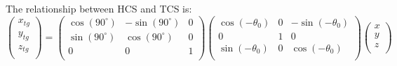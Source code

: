 The relationship between HCS and TCS is:
\begin{equation}
    \begin{pmatrix}
	x_{tg}	\\
	y_{tg}	\\
	z_{tg}	\\
    \end{pmatrix}
    =
    \begin{pmatrix}
	\cos(90^\circ)   & -\sin(90^\circ)    & 0	\\
	\sin(90^\circ)   & \cos(90^\circ)     & 0	\\
	0   & 0     & 1	\\
    \end{pmatrix}
    \begin{pmatrix}
	\cos(-\theta_0)	& 0 & -\sin(-\theta_0)  \\
	0		& 1 & 0		\\
	\sin(-\theta_0)	& 0 & \cos(-\theta_0)  \\
    \end{pmatrix}
    \begin{pmatrix}
	x   \\
	y   \\
	z   \\
    \end{pmatrix}
\end{equation}

